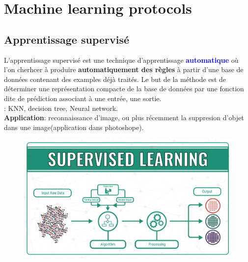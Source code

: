 \section{Machine learning protocols}
\subsection{Apprentissage supervisé}
L'apprentissage supervisé est une technique d'apprentissage \textcolor{blue}{\textbf{automatique}} où l'on cherhcer à produire \textbf{automatiquement des règles} à partir d'une base de données contenant des examples déjà traités. Le but de la méthode est de déterminer une représentation compacte de la base de données par une fonction dite de prédiction associant à une entrée, une sortie.\\
\Exemple: KNN, decision tree, Neural network. \\
\textbf{Application}: reconnaissance d'image, ou plus récemment la suppresion d'objet dans une image(application dans photoshope). 
\begin{figure}[H]
    \centering
    \includegraphics[scale = 0.5]{Question1/supervised-learning.png}
    \caption{}
    \label{fig:my_label}
\end{figure}
